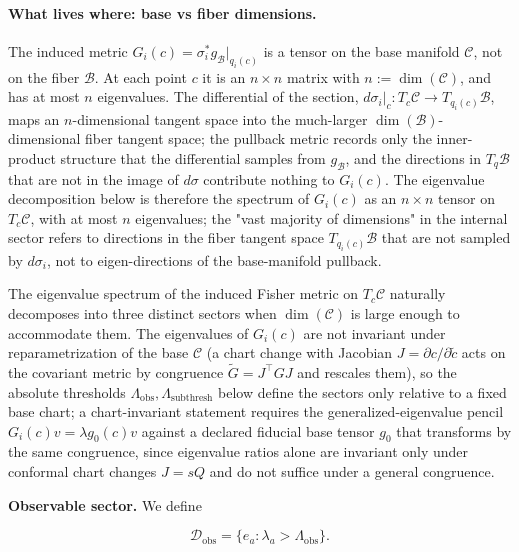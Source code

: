 \documentclass[11pt]{article}
\begin{document}
\paragraph{What lives where: base vs fiber dimensions.} The induced metric $G_i(c) = \sigma_i^* g_{\mathcal{B}}|_{q_i(c)}$ is a tensor on the base manifold $\mathcal{C}$, not on the fiber $\mathcal{B}$. At each point $c$ it is an $n \times n$ matrix with $n := \dim(\mathcal{C})$, and has at most $n$ eigenvalues. The differential of the section, $d\sigma_i|_c: T_c\mathcal{C} \to T_{q_i(c)}\mathcal{B}$, maps an $n$-dimensional tangent space into the much-larger $\dim(\mathcal{B})$-dimensional fiber tangent space; the pullback metric records only the inner-product structure that the differential samples from $g_{\mathcal{B}}$, and the directions in $T_q\mathcal{B}$ that are not in the image of $d\sigma$ contribute nothing to $G_i(c)$. The eigenvalue decomposition below is therefore the spectrum of $G_i(c)$ as an $n\times n$ tensor on $T_c\mathcal{C}$, with at most $n$ eigenvalues; the "vast majority of dimensions" in the internal sector refers to directions in the fiber tangent space $T_{q_i(c)}\mathcal{B}$ that are not sampled by $d\sigma_i$, not to eigen-directions of the base-manifold pullback.

The eigenvalue spectrum of the induced Fisher metric on $T_c\mathcal{C}$ naturally decomposes into three distinct sectors when $\dim(\mathcal{C})$ is large enough to accommodate them. The eigenvalues of $G_i(c)$ are not invariant under reparametrization of the base $\mathcal{C}$ (a chart change with Jacobian $J = \partial c/\partial\tilde{c}$ acts on the covariant metric by congruence $\tilde{G} = J^{\top} G J$ and rescales them), so the absolute thresholds $\Lambda_{\text{obs}}, \Lambda_{\text{subthresh}}$ below define the sectors only relative to a fixed base chart; a chart-invariant statement requires the generalized-eigenvalue pencil $G_i(c) v = \lambda g_0(c) v$ against a declared fiducial base tensor $g_0$ that transforms by the same congruence, since eigenvalue ratios alone are invariant only under conformal chart changes $J = sQ$ and do not suffice under a general congruence.

\textbf{Observable sector.} We define

\begin{equation}
\mathcal{D}_{\text{obs}} = \{e_a : \lambda_a > \Lambda_{\text{obs}}\}.
\end{equation}
\end{document}
